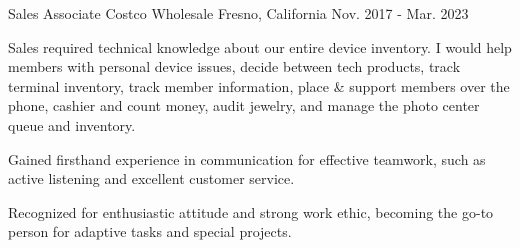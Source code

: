 \begin{cventries}
  \cventry
    {Sales Associate} %
    {Costco Wholesale} %
    {Fresno, California} %
    {Nov. 2017 - Mar. 2023} %
    {
      \begin{cvitems} %
	  \item {Sales required technical knowledge about our entire device inventory. I would help members with personal device issues, decide between tech products, track terminal inventory, track member information, place \& support members over the phone, cashier and count money, audit jewelry, and manage the photo center queue and inventory.}
	  \item {Gained firsthand experience in communication for effective teamwork, such as active listening and excellent customer service. }
	  \item {Recognized for enthusiastic attitude and strong work ethic, becoming the go-to person for adaptive tasks and special projects.} 
	  \end{cvitems}
	 }

\end{cventries}
